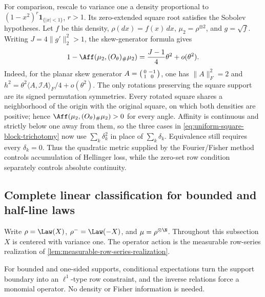 For comparison, rescale to variance one a density proportional
to \((1-x^2)^r\mathbf1_{\{|x|<1\}}\), \(r>1\).
Its zero-extended square root satisfies the Sobolev hypotheses.
Let \(f\) be this density, \(\rho(dx)=f(x)\,dx\),
\(\mu_2=\rho^{\otimes2}\), and \(g=\sqrt f\).
Writing \(J=4\|g'\|_2^2>1\), the skew-generator formula gives
\begin{equation}
 1-\Aff(\mu_2,(O_\theta)_\#\mu_2)=\frac{J-1}{4}\theta^2+o(\theta^2).
 \label{eq:smooth-boundary-rotation-affinity}
\end{equation}
Indeed, for the planar skew generator
\(A=\begin{psmallmatrix}0&-1\\1&0\end{psmallmatrix}\), one has
\(\|A\|_F^2=2\) and
\(h^2=\theta^2\langle A,\mathcal I A\rangle_F/4+o(\theta^2)\).
The only rotations preserving the square support are its signed
permutation symmetries.
Every rotated square shares a neighborhood of the origin with the
original square, on which both densities are positive; hence
\(\Aff(\mu_2,(O_\theta)_\#\mu_2)>0\) for every angle.
Affinity is continuous and strictly below one away from them,
so the three cases in \eqref{eq:uniform-square-block-trichotomy}
now use \(\sum_k\delta_k^2\) in place of \(\sum_k\delta_k\).
Equivalence still requires every \(\delta_k=0\).
Thus the quadratic metric supplied by the Fourier/Fisher method controls
accumulation of Hellinger loss, while the zero-set row condition separately
controls absolute continuity.

\subsection{Complete linear classification for bounded and half-line laws}
\label{sec:bounded-and-half-line-classification}

Write \(\rho=\Law(X)\), \(\rho^-=\Law(-X)\), and
\(\mu=\rho^{\otimes\N}\).
Throughout this subsection \(X\) is centered with variance one.
The operator action is the measurable row-series realization of
\cref{lem:measurable-row-series-realization}.

For bounded and one-sided supports, conditional expectations turn the support
boundary into an \(\ell^1\)-type row constraint, and the inverse relations
force a monomial operator.  No density or Fisher information is needed.

